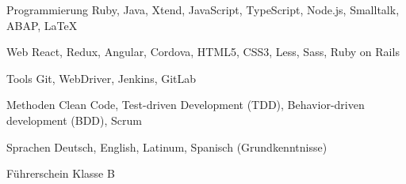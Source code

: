 

\begin{cvskills}

  \cvskill
    {Programmierung} %
    {Ruby, Java, Xtend, JavaScript, TypeScript, Node.js, Smalltalk, ABAP, \LaTeX} %

  \cvskill
    {Web} %
    {React, Redux, Angular, Cordova, HTML5, CSS3, Less, Sass, Ruby on Rails} %

  \cvskill
    {Tools} %
    {Git, WebDriver, Jenkins, GitLab} %

  \cvskill
    {Methoden} %
    {Clean Code, Test-driven Development (TDD), Behavior-driven development (BDD), Scrum} %

  \cvskill
    {Sprachen} %
    {Deutsch, English, Latinum, Spanisch (Grundkenntnisse)} %

  \cvskill
    {Führerschein} %
    {Klasse B} %

\end{cvskills}
